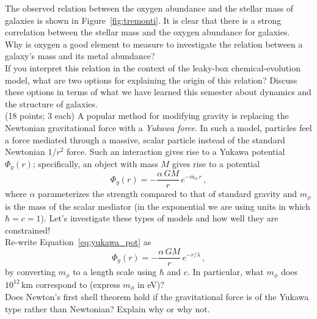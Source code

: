 \documentclass[12pt]{article}
\begin{document}
 The observed relation
between the oxygen abundance and the stellar mass of galaxies is shown
in Figure~\ref{fig:tremonti}. It is clear that there is a strong
correlation between the stellar mass and the oxygen abundance for
galaxies. \\

 Why is oxygen a good element to measure to
investigate the relation between a galaxy's mass and its metal
abundance?\\

 If you interpret this relation in the context of
the leaky-box chemical-evolution model, what are two options for
explaining the origin of this relation? Discuss these options in terms
of what we have learned this semester about dynamics and the structure
of galaxies.\\

 (18 points; 3 each) A popular method for
modifying gravity is replacing the Newtonian gravitational force with
a \emph{Yukawa force}. In such a model, particles feel a force
mediated through a massive, scalar particle instead of the standard
Newtonian $1/r^2$ force. Such an interaction gives rise to a Yukawa
potential $\Phi_y(r)$; specifically, an object with mass $M$ gives
rise to a potential
\begin{equation}\label{eq:yukawa_pot}
  \Phi_y(r) = -\frac{\alpha\,GM}{r}\,e^{-m_\phi\,r}\,,
\end{equation}
where $\alpha$ parameterizes the strength compared to that of standard
gravity and $m_\phi$ is the mass of the scalar mediator (in the
exponential we are using units in which $\hbar = c = 1$). Let's
investigate these types of models and how well they are constrained!\\

 Re-write Equation~\eqref{eq:yukawa_pot} as
\begin{equation}
  \Phi_y(r) = -\frac{\alpha\,GM}{r}\,e^{-r/\lambda}\,,
\end{equation}
by converting $m_\phi$ to a length scale using $\hbar$ and $c$. In
particular, what $m_\phi$ does $10^{12}\,\mathrm{km}$ correspond to
(express $m_\phi$ in eV)?\\

 Does Newton's first shell theorem hold if the
gravitational force is of the Yukawa type rather than Newtonian?
Explain why or why not.\\
\end{document}

